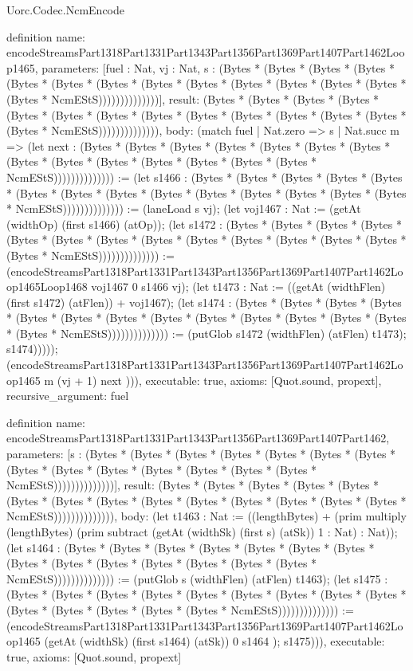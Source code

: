\begin{lexlean}{Uorc.Codec.NcmEncode}
\begin{semanticmodule}
definition{
  name: encodeStreamsPart1318Part1331Part1343Part1356Part1369Part1407Part1462Loop1465,
  parameters: [fuel : Nat, vj : Nat, s : (Bytes * (Bytes * (Bytes * (Bytes * (Bytes * (Bytes * (Bytes * (Bytes * (Bytes * (Bytes * (Bytes * (Bytes * (Bytes * (Bytes * NcmEStS))))))))))))))],
  result: (Bytes * (Bytes * (Bytes * (Bytes * (Bytes * (Bytes * (Bytes * (Bytes * (Bytes * (Bytes * (Bytes * (Bytes * (Bytes * (Bytes * NcmEStS)))))))))))))),
  body: (match fuel
    | Nat.zero => s
    | Nat.succ m => (let next : (Bytes * (Bytes * (Bytes * (Bytes * (Bytes * (Bytes * (Bytes * (Bytes * (Bytes * (Bytes * (Bytes * (Bytes * (Bytes * (Bytes * NcmEStS)))))))))))))) := (let s1466 : (Bytes * (Bytes * (Bytes * (Bytes * (Bytes * (Bytes * (Bytes * (Bytes * (Bytes * (Bytes * (Bytes * (Bytes * (Bytes * (Bytes * NcmEStS)))))))))))))) := (laneLoad s vj); (let voj1467 : Nat := (getAt (widthOp) (first s1466) (atOp)); (let s1472 : (Bytes * (Bytes * (Bytes * (Bytes * (Bytes * (Bytes * (Bytes * (Bytes * (Bytes * (Bytes * (Bytes * (Bytes * (Bytes * (Bytes * NcmEStS)))))))))))))) := (encodeStreamsPart1318Part1331Part1343Part1356Part1369Part1407Part1462Loop1465Loop1468 voj1467 0 s1466 vj); (let t1473 : Nat := ((getAt (widthFlen) (first s1472) (atFlen)) + voj1467); (let s1474 : (Bytes * (Bytes * (Bytes * (Bytes * (Bytes * (Bytes * (Bytes * (Bytes * (Bytes * (Bytes * (Bytes * (Bytes * (Bytes * (Bytes * NcmEStS)))))))))))))) := (putGlob s1472 (widthFlen) (atFlen) t1473); s1474))))); (encodeStreamsPart1318Part1331Part1343Part1356Part1369Part1407Part1462Loop1465 m (vj + 1) next ))),
  executable: true,
  axioms: [Quot.sound, propext],
  recursive_argument: fuel
}

definition{
  name: encodeStreamsPart1318Part1331Part1343Part1356Part1369Part1407Part1462,
  parameters: [s : (Bytes * (Bytes * (Bytes * (Bytes * (Bytes * (Bytes * (Bytes * (Bytes * (Bytes * (Bytes * (Bytes * (Bytes * (Bytes * (Bytes * NcmEStS))))))))))))))],
  result: (Bytes * (Bytes * (Bytes * (Bytes * (Bytes * (Bytes * (Bytes * (Bytes * (Bytes * (Bytes * (Bytes * (Bytes * (Bytes * (Bytes * NcmEStS)))))))))))))),
  body: (let t1463 : Nat := ((lengthBytes) + (prim multiply (lengthBytes) (prim subtract (getAt (widthSk) (first s) (atSk)) 1 : Nat) : Nat)); (let s1464 : (Bytes * (Bytes * (Bytes * (Bytes * (Bytes * (Bytes * (Bytes * (Bytes * (Bytes * (Bytes * (Bytes * (Bytes * (Bytes * (Bytes * NcmEStS)))))))))))))) := (putGlob s (widthFlen) (atFlen) t1463); (let s1475 : (Bytes * (Bytes * (Bytes * (Bytes * (Bytes * (Bytes * (Bytes * (Bytes * (Bytes * (Bytes * (Bytes * (Bytes * (Bytes * (Bytes * NcmEStS)))))))))))))) := (encodeStreamsPart1318Part1331Part1343Part1356Part1369Part1407Part1462Loop1465 (getAt (widthSk) (first s1464) (atSk)) 0 s1464 ); s1475))),
  executable: true,
  axioms: [Quot.sound, propext]
}


\end{semanticmodule}
\end{lexlean}
